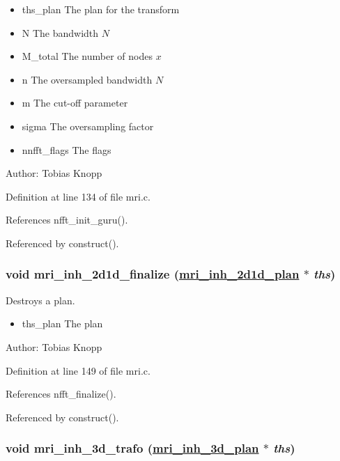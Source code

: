\begin{itemize}
\item ths\_\-plan The plan for the transform \item N The bandwidth $N$ \item M\_\-total The number of nodes $x$ \item n The oversampled bandwidth $N$ \item m The cut-off parameter \item sigma The oversampling factor \item nnfft\_\-flags The flags\end{itemize}
\begin{Desc}
\item[Author:]Tobias Knopp \end{Desc}


Definition at line 134 of file mri.c.

References nfft\_\-init\_\-guru().

Referenced by construct().\hypertarget{group__mri_ga3}{
\subsubsection[mri\_\-inh\_\-2d1d\_\-finalize]{\setlength{\rightskip}{0pt plus 5cm}void mri\_\-inh\_\-2d1d\_\-finalize (\hyperlink{structmri__inh__2d1d__plan}{mri\_\-inh\_\-2d1d\_\-plan} $\ast$ {\em ths})}}
\label{group__mri_ga3}


Destroys a plan. 

\begin{itemize}
\item ths\_\-plan The plan\end{itemize}
\begin{Desc}
\item[Author:]Tobias Knopp \end{Desc}


Definition at line 149 of file mri.c.

References nfft\_\-finalize().

Referenced by construct().\hypertarget{group__mri_ga4}{
\subsubsection[mri\_\-inh\_\-3d\_\-trafo]{\setlength{\rightskip}{0pt plus 5cm}void mri\_\-inh\_\-3d\_\-trafo (\hyperlink{structmri__inh__3d__plan}{mri\_\-inh\_\-3d\_\-plan} $\ast$ {\em ths})}}
\label{group__mri_ga4}


